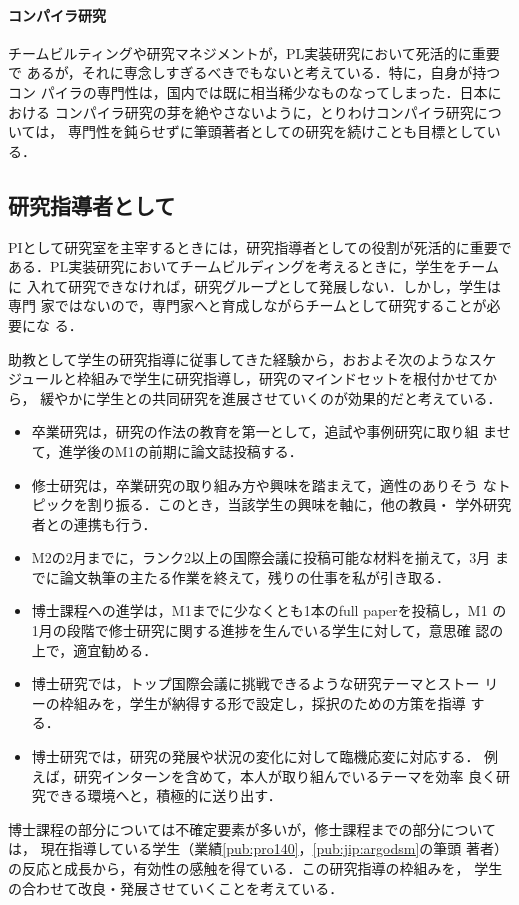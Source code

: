 \documentclass[dvipdfmx]{jsarticle}
\begin{document}
\paragraph{コンパイラ研究}
チームビルティングや研究マネジメントが，PL実装研究において死活的に重要で
あるが，それに専念しすぎるべきでもないと考えている．特に，自身が持つコン
パイラの専門性は，国内では既に相当稀少なものなってしまった．日本における
コンパイラ研究の芽を絶やさないように，とりわけコンパイラ研究については，
専門性を鈍らせずに筆頭著者としての研究を続けことも目標としている．

\subsection*{研究指導者として}
PIとして研究室を主宰するときには，研究指導者としての役割が死活的に重要で
ある．PL実装研究においてチームビルディングを考えるときに，学生をチームに
入れて研究できなければ，研究グループとして発展しない．しかし，学生は専門
家ではないので，専門家へと育成しながらチームとして研究することが必要にな
る．

助教として学生の研究指導に従事してきた経験から，おおよそ次のようなスケ
ジュールと枠組みで学生に研究指導し，研究のマインドセットを根付かせてから，
緩やかに学生との共同研究を進展させていくのが効果的だと考えている．
\begin{itemize}
 \item 卒業研究は，研究の作法の教育を第一として，追試や事例研究に取り組
       ませて，進学後のM1の前期に論文誌投稿する．

 \item 修士研究は，卒業研究の取り組み方や興味を踏まえて，適性のありそう
       なトピックを割り振る．このとき，当該学生の興味を軸に，他の教員・
       学外研究者との連携も行う．

 \item M2の2月までに，ランク2以上の国際会議に投稿可能な材料を揃えて，3月
       までに論文執筆の主たる作業を終えて，残りの仕事を私が引き取る．

 \item 博士課程への進学は，M1までに少なくとも1本のfull paperを投稿し，M1
       の1月の段階で修士研究に関する進捗を生んでいる学生に対して，意思確
       認の上で，適宜勧める．

 \item 博士研究では，トップ国際会議に挑戦できるような研究テーマとストー
       リーの枠組みを，学生が納得する形で設定し，採択のための方策を指導
       する．

 \item 博士研究では，研究の発展や状況の変化に対して臨機応変に対応する．
       例えば，研究インターンを含めて，本人が取り組んでいるテーマを効率
       良く研究できる環境へと，積極的に送り出す．
\end{itemize}
博士課程の部分については不確定要素が多いが，修士課程までの部分については，
現在指導している学生（業績\ref{pub:pro140}，\ref{pub:jip:argodsm}の筆頭
著者）の反応と成長から，有効性の感触を得ている．この研究指導の枠組みを，
学生の合わせて改良・発展させていくことを考えている．
\end{document}
